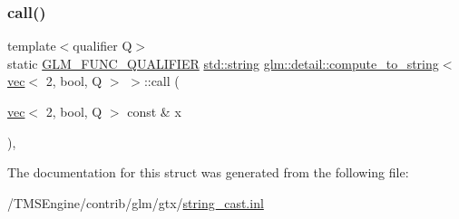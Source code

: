 \subsubsection{\texorpdfstring{call()}{call()}}
{\footnotesize\ttfamily template$<$qualifier Q$>$ \\
static \hyperlink{setup_8hpp_a33fdea6f91c5f834105f7415e2a64407}{G\+L\+M\+\_\+\+F\+U\+N\+C\+\_\+\+Q\+U\+A\+L\+I\+F\+I\+ER} \hyperlink{_s_d_l__opengl__glext_8h_ae84541b4f3d8e1ea24ec0f466a8c568b}{std\+::string} \hyperlink{structglm_1_1detail_1_1compute__to__string}{glm\+::detail\+::compute\+\_\+to\+\_\+string}$<$ \hyperlink{structglm_1_1vec}{vec}$<$ 2, bool, Q $>$ $>$\+::call (\begin{DoxyParamCaption}\item[{\hyperlink{structglm_1_1vec}{vec}$<$ 2, bool, Q $>$ const \&}]{x }\end{DoxyParamCaption})\hspace{0.3cm}{\ttfamily [inline]}, {\ttfamily [static]}}



The documentation for this struct was generated from the following file\+:\begin{DoxyCompactItemize}
\item 
/\+T\+M\+S\+Engine/contrib/glm/gtx/\hyperlink{string__cast_8inl}{string\+\_\+cast.\+inl}\end{DoxyCompactItemize}
